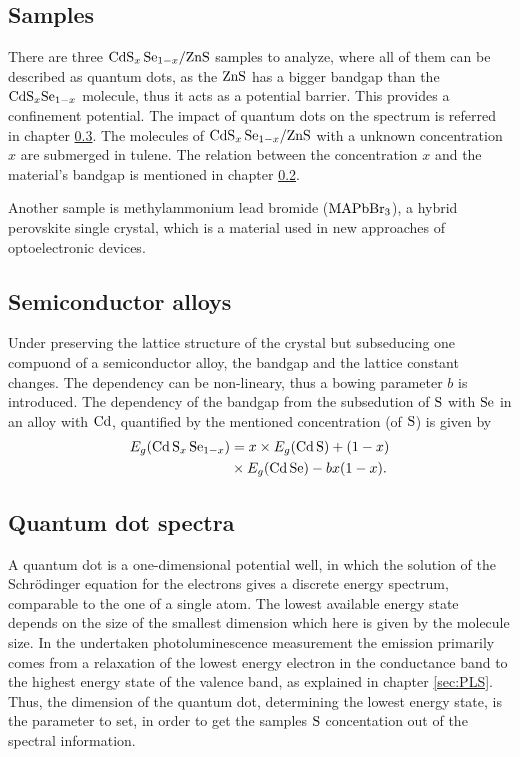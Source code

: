\subsection{Samples}
\label{sec:samples}

There are three $\ce{CdS_x Se_{1-x}/ZnS}$ samples to analyze, where all of them can be described as quantum dots, as the $\ce{ZnS}$ has a bigger bandgap than the $\ce{CdS_xSe_{1-x}}$ molecule, 
thus it acts as a potential barrier.
This provides a confinement potential. The impact of quantum dots on the spectrum is referred in chapter \ref{sec:QD}.
The molecules of $\ce{CdS_x Se_{1-x}/ZnS}$ with a unknown concentration $x$ are submerged in tulene.
The relation between the concentration $x$ and the material's bandgap is mentioned in chapter \ref{sec:SemAll}.

Another sample is methylammonium lead bromide ($\ce{MAPbBr_3}$), a hybrid perovskite single crystal, which is a material used in new approaches of optoelectronic devices.

\subsection{Semiconductor alloys}
\label{sec:SemAll}

Under preserving the lattice structure of the crystal but subseducing one compuond of a semiconductor alloy, the bandgap and the lattice constant changes.
The dependency can be non-lineary, thus a bowing parameter $b$ is introduced. 
The dependency of the bandgap from the subsedution of $\ce{S}$ with $\ce{Se}$ in an alloy with $\ce{Cd}$, quantified by the mentioned concentration (of $\ce{S}$) is given by
\begin{align*}
    E_g(\ce{Cd S_x Se_{1-x}}) &= x \times E_g(\ce{Cd S}) + (1-x) \\ &\times E_g(\ce{Cd Se}) - bx(1-x).
\end{align*}\label{eq:E-G}

\subsection{Quantum dot spectra}
\label{sec:QD}

A quantum dot is a one-dimensional potential well, in which the solution of the Schrödinger equation for the electrons gives a discrete energy spectrum, comparable to the one of a single atom.
The lowest available energy state depends on the size of the smallest dimension which here is given by the molecule size.
In the undertaken photoluminescence measurement the emission primarily comes from a relaxation of the lowest energy electron in the conductance band to the highest energy state of the valence band, as explained in chapter \ref{sec:PLS}.
Thus, the dimension of the quantum dot, determining the lowest energy state, is the parameter to set, in order to get the samples $\ce{S}$ concentation out of the spectral information.

